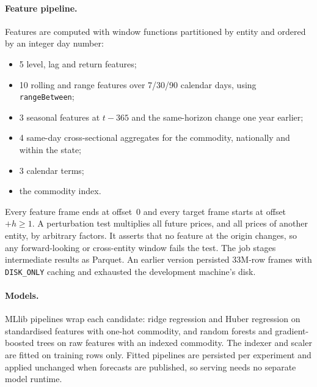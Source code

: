 \paragraph{Feature pipeline.}
Features are computed with window functions partitioned by entity and ordered by an integer day number:
\begin{itemize}
  \item 5 level, lag and return features;
  \item 10 rolling and range features over 7/30/90 calendar days, using \texttt{rangeBetween};
  \item 3 seasonal features at $t-365$ and the same-horizon change one year earlier;
  \item 4 same-day cross-sectional aggregates for the commodity, nationally and within the state;
  \item 3 calendar terms;
  \item the commodity index.
\end{itemize}
Every feature frame ends at offset~0 and every target frame starts at offset $+h\ge 1$.
A perturbation test multiplies all future prices, and all prices of another entity, by arbitrary factors.
It asserts that no feature at the origin changes, so any forward-looking or cross-entity window fails the test.
The job stages intermediate results as Parquet.
An earlier version persisted 33M-row frames with \texttt{DISK\_ONLY} caching and exhausted the development machine's disk.

\paragraph{Models.}
MLlib pipelines wrap each candidate: ridge regression and Huber regression on standardised features with one-hot commodity, and random forests and gradient-boosted trees on raw features with an indexed commodity.
The indexer and scaler are fitted on training rows only.
Fitted pipelines are persisted per experiment and applied unchanged when forecasts are published, so serving needs no separate model runtime.

